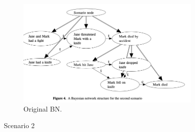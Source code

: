 \begin{figure}[htbp]
\begin{subfigure}{.4\textwidth}
\label{kb2}
\end{subfigure}
\begin{subfigure}{.7\textwidth}
\includegraphics[scale=0.4]{images/vlek2015.png}
\caption{Original BN.}
\label{vlek}
\end{subfigure}
\caption{Scenario 2}
\end{figure}


